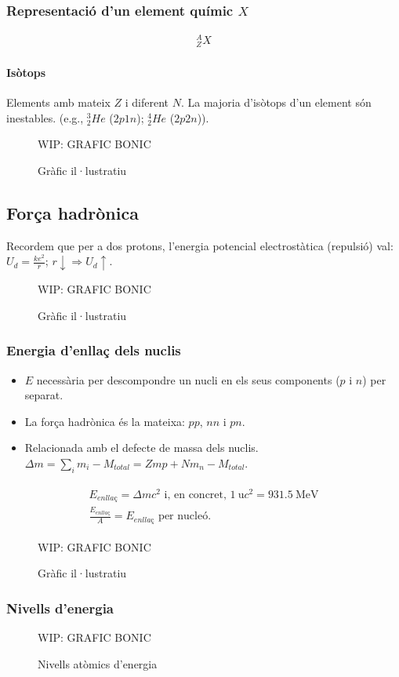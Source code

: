 \subsubsection*{Representació d'un element químic $X$}
\begin{align}
    _{Z}^{A}X
\end{align}
\paragraph*{Isòtops} Elements amb mateix $Z$ i diferent $N$. La majoria d'isòtops d'un element són inestables.
(e.g., $_{2}^{3} He$ ($2p1n$); $_{2}^{4} He$ ($2p2n$)).
\begin{figure}[H]
\centering
    WIP: GRAFIC BONIC 
\caption{Gràfic il·lustratiu}
\end{figure}

\subsection{Força hadrònica}
Recordem que per a dos protons, l'energia potencial electrostàtica (repulsió) val: $U_{d} = \frac{ke^{2}}{r}$; $r \downarrow \Rightarrow U_{d} \uparrow$.
\begin{figure}[H]
\centering
    WIP: GRAFIC BONIC 
\caption{Gràfic il·lustratiu}
\end{figure}

\subsubsection*{Energia d'enllaç dels nuclis}
\begin{itemize}
    \item $E$ necessària per descompondre un nucli en els seus components ($p$ i $n$) per separat.
    \item La força hadrònica és la mateixa: $pp$, $nn$ i $pn$.
    \item Relacionada amb el defecte de massa dels nuclis. $\Delta m = \sum\limits_{i} m_{i} - M_{total} = Zm{p} + Nm_{n} - M_{total} $.
\end{itemize}
\begin{align}
    \begin{gathered}
        E_{enllaç} = \Delta m c^{2} \text{ i, en concret, } \SI{1}{\amu} c^{2} = \SI{931.5}{\MeV} \\
        \frac{E_{enllaç}}{A} = E_{enllaç} \text{ per nucleó.}
    \end{gathered}
\end{align}

\begin{figure}[H]
\centering
    WIP: GRAFIC BONIC 
\caption{Gràfic il·lustratiu}
\end{figure}

\subsubsection*{Nivells d'energia}
\begin{figure}[H]
\centering
    WIP: GRAFIC BONIC 
\caption{Nivells atòmics d'energia}
\end{figure}